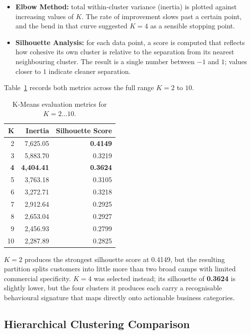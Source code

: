 \documentclass[12pt, a4paper]{article}
\begin{document}
\begin{itemize}[nosep]
    \item \textbf{Elbow Method:} total within-cluster variance (inertia) is plotted against increasing values of $K$. The rate of improvement slows past a certain point, and the bend in that curve suggested $K=4$ as a sensible stopping point.
    \item \textbf{Silhouette Analysis:} for each data point, a score is computed that reflects how cohesive its own cluster is relative to the separation from its nearest neighbouring cluster. The result is a single number between $-1$ and $1$; values closer to $1$ indicate cleaner separation.
\end{itemize}

\noindent Table~\ref{tab:eval_metrics} records both metrics across the full range $K = 2$ to $10$.

\begin{table}[H]
\centering
\caption{K-Means evaluation metrics for $K=2\ldots10$.}
\label{tab:eval_metrics}
\begin{tabular}{@{}rrr@{}}
\toprule
\textbf{K} & \textbf{Inertia} & \textbf{Silhouette Score} \\
\midrule
2  & 7,625.05 & \textbf{0.4149} \\
3  & 5,883.70 & 0.3219 \\
\textbf{4}  & \textbf{4,404.41} & \textbf{0.3624} \\
5  & 3,763.18 & 0.3105 \\
6  & 3,272.71 & 0.3218 \\
7  & 2,912.64 & 0.2925 \\
8  & 2,653.04 & 0.2927 \\
9  & 2,456.93 & 0.2799 \\
10 & 2,287.89 & 0.2825 \\
\bottomrule
\end{tabular}
\end{table}

\noindent $K=2$ produces the strongest silhouette score at 0.4149, but the resulting partition splits customers into little more than two broad camps with limited commercial specificity. \textbf{$K=4$} was selected instead; its silhouette of \textbf{0.3624} is slightly lower, but the four clusters it produces each carry a recognisable behavioural signature that maps directly onto actionable business categories.

\subsection{Hierarchical Clustering Comparison}
\end{document}
